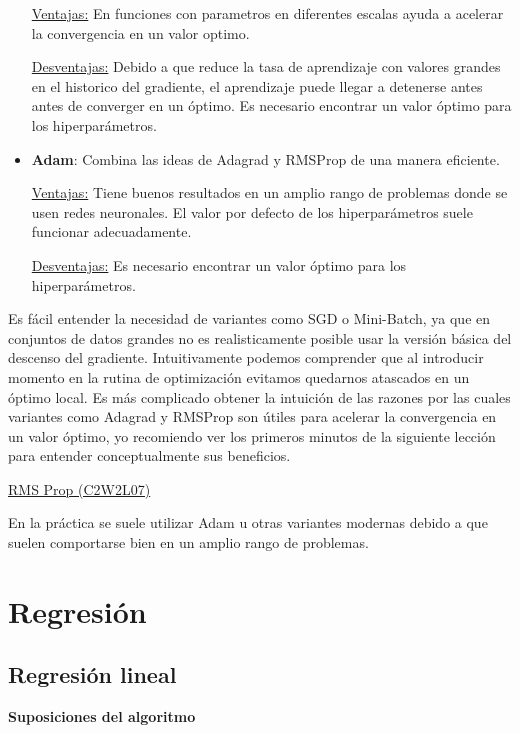 \documentclass[11pt,fleqn]{book} %
\begin{document}
\begin{itemize}
\underline{Ventajas:}
En funciones con parametros en diferentes escalas ayuda a acelerar la convergencia en un valor optimo.

\underline{Desventajas:}
Debido a que reduce la tasa de aprendizaje con valores grandes en el historico del gradiente, el aprendizaje puede llegar a detenerse antes antes de converger en un óptimo. Es necesario encontrar un valor óptimo para los hiperparámetros.
\\

\item \textbf{Adam}: Combina las ideas de Adagrad y RMSProp de una manera eficiente.

\underline{Ventajas:}
Tiene buenos resultados en un amplio rango de problemas donde se usen redes neuronales. El valor por defecto de los hiperparámetros suele funcionar adecuadamente.

\underline{Desventajas:}
Es necesario encontrar un valor óptimo para los hiperparámetros.
\\

\end{itemize}

Es fácil entender la necesidad de variantes como SGD o Mini-Batch, ya que en conjuntos de datos grandes no es realisticamente posible usar la versión básica del descenso del gradiente. Intuitivamente podemos comprender que al introducir momento en la rutina de optimización evitamos quedarnos atascados en un óptimo local. Es más complicado obtener la intuición de las razones por las cuales variantes como Adagrad y RMSProp son útiles para acelerar la convergencia en un valor óptimo, yo recomiendo ver los primeros minutos de la siguiente lección para entender conceptualmente sus beneficios.

\href{https://www.youtube.com/watch?v=_e-LFe_igno&t=392s&ab_channel=DeepLearningAI}{RMS Prop (C2W2L07)}

En la práctica se suele utilizar Adam u otras variantes modernas debido a que suelen comportarse bien en un amplio rango de problemas.

\section{Regresión} 

\subsection{Regresión lineal} 
\textbf{Suposiciones del algoritmo}
\end{document}
